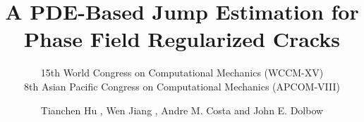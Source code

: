 \title{A PDE-Based Jump Estimation for Phase Field Regularized Cracks}
\subtitle{15th World Congress on Computational Mechanics (WCCM-XV) \\ 8th Asian Pacific Congress on Computational Mechanics (APCOM-VIII) }

\author[shortname]{ Tianchen Hu , Wen Jiang , Andre M. Costa  and John E. Dolbow  }

\date{ }
